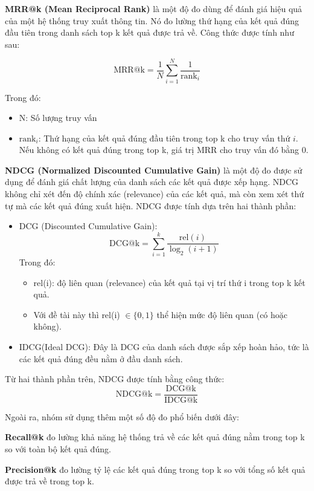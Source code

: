 \documentclass{article}
\numberwithin{equation}{section}
\numberwithin{equation}{section}
\begin{document}
\textbf{MRR@k (Mean Reciprocal Rank)} là một độ đo dùng để đánh giá hiệu quả của một hệ thống truy xuất thông tin. Nó đo lường thứ hạng của kết quả đúng đầu tiên trong danh sách top k kết quả được trả về. Công thức được tính như sau:

\[
\text{MRR@k} = \frac{1}{N} \sum_{i=1}^{N} \frac{1}{\text{rank}_i}
\]

Trong đó:
\begin{itemize}
    \item N: Số lượng truy vấn
    \item $\text{rank}_i$: Thứ hạng của kết quả đúng đầu tiên trong top k cho truy vấn thứ $i$. Nếu không có kết quả đúng trong top k, giá trị MRR cho truy vấn đó bằng 0.
\end{itemize}

\textbf{NDCG (Normalized Discounted Cumulative Gain)} là một độ đo được sử dụng để đánh giá chất lượng của danh sách các kết quả được xếp hạng. NDCG không chỉ xét đến độ chính xác (relevance) của các kết quả, mà còn xem xét thứ tự mà các kết quả đúng xuất hiện. NDCG được tính dựa trên hai thành phần:

\begin{itemize}
    \item DCG (Discounted Cumulative Gain):
    \[
    \text{DCG@k} = \sum_{i=1}^{k} \frac{\text{rel}(i)}{\log_2(i+1)}
    \]
    Trong đó: 
    \begin{itemize}
        \item rel(i): độ liên quan (relevance) của kết quả tại vị trí thứ i trong top k kết quả.
        \item Với đề tài này thì rel(i) $\in \{0, 1\}$ thể hiện mức độ liên quan (có hoặc không).
    \end{itemize}

    \item IDCG(Ideal DCG): Đây là DCG của danh sách được sắp xếp hoàn hảo, tức là các kết quả đúng đều nằm ở đầu danh sách.
\end{itemize}

Từ hai thành phần trên, NDCG được tính bằng công thức:
\[
\text{NDCG@k} = \frac{\text{DCG@k}}{\text{IDCG@k}}
\]

Ngoài ra, nhóm sử dụng thêm một số độ đo phổ biến dưới đây:

\textbf{Recall@k} đo lường khả năng hệ thống trả về các kết quả đúng nằm trong top k so với toàn bộ kết quả đúng.

\textbf{Precision@k} đo lường tỷ lệ các kết quả đúng trong top k so với tổng số kết quả được trả về trong top k.
\end{document}
